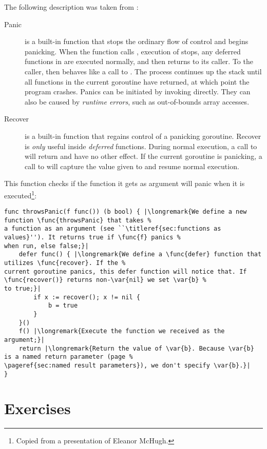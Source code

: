 The following description was taken from \cite{go_blog_panic}:
\begin{description}
\item[Panic]{is a built-in function that stops the ordinary flow of control and begins panicking. When the function 
 calls ,
execution of  stops, any deferred functions in  are executed normally, and 
then  returns to its caller. To the caller,  then
behaves like a call to . The process continues up the stack until all functions in the current 
goroutine have returned, at which point the program crashes. 
Panics can be initiated by invoking  directly. They can also be caused by \emph{runtime errors}, such
as out-of-bounds array accesses.}

\item[Recover]{is a built-in function that regains control of a panicking goroutine. Recover is \emph{only} useful inside 
\emph{deferred} functions.
During normal execution, a call to  will return  and have no other effect. 
If the current goroutine is panicking, a call
to  will capture the value given to  and resume normal execution.}
\end{description}

This function checks if the function it gets as argument will panic when it is
executed\footnote{Copied from a presentation of Eleanor McHugh.}:
\begin{lstlisting}
func throwsPanic(f func()) (b bool) { |\longremark{We define a new function \func{throwsPanic} that takes %
a function as an argument (see ``\titleref{sec:functions as values}''). It returns true if \func{f} panics %
when run, else false;}|
    defer func() { |\longremark{We define a \func{defer} function that utilizes \func{recover}. If the %
current goroutine panics, this defer function will notice that. If \func{recover()} returns non-\var{nil} we set \var{b} %
to true;}|
        if x := recover(); x != nil {
            b = true
        }
    }()
    f() |\longremark{Execute the function we received as the argument;}|
    return |\longremark{Return the value of \var{b}. Because \var{b} is a named return parameter (page %
\pageref{sec:named result parameters}), we don't specify \var{b}.}|
}
\end{lstlisting}
\showremarks


\section{Exercises}


